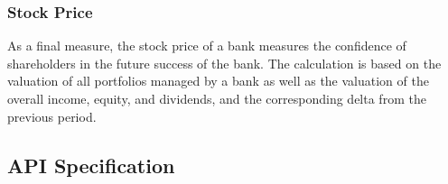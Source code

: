 \subsubsection{Stock Price}
As a final measure, the stock price of a bank measures the confidence of shareholders in the future success of the bank. The calculation is based on the  valuation of all portfolios managed by a bank as well as the valuation of the overall income, equity, and dividends, and the corresponding delta from the previous period.


\subsection{API Specification}


